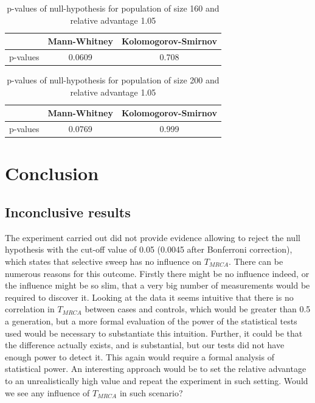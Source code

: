 \documentclass{l4proj}
\begin{document}
\begin{table}[]
    \centering
    \begin{tabular}{|c|c|c|}
    \hline
    & Mann-Whitney & Kolomogorov-Smirnov \\ \hline
    p-values & 0.0609 & 0.708  \\ \hline
    \end{tabular}
    \caption{p-values of null-hypothesis for population of size 160 and relative advantage 1.05}
\end{table}

\begin{table}[]
    \centering
    \begin{tabular}{|c|c|c|}
    \hline
    & Mann-Whitney & Kolomogorov-Smirnov \\ \hline
    p-values & 0.0769 & 0.999  \\ \hline
    \end{tabular}
    \caption{p-values of null-hypothesis for population of size 200 and relative advantage 1.05}
\end{table}


\chapter{Conclusion}\label{conclusion}

\section{Inconclusive results}

The experiment carried out did not provide evidence allowing to reject the null hypothesis with the cut-off value of 0.05 (0.0045 after Bonferroni correction), which states that selective sweep has no influence on $T_{MRCA}$. There can be numerous reasons for this outcome. Firstly there might be no influence indeed, or the influence might be so slim, that a very big number of measurements would be required to discover it. Looking at the data it seems intuitive that there is no correlation in $T_{MRCA}$ between cases and controls, which would be greater than 0.5 a generation, but a more formal evaluation of the power of the statistical tests used would be necessary to substantiate this intuition. Further, it could be that the difference actually exists, and is substantial, but our tests did not have enough power to detect it. This again would require a formal analysis of statistical power. An interesting approach would be to set the relative advantage to an unrealistically high value and repeat the experiment in such setting. Would we see any influence of $T_{MRCA}$ in such scenario?
\end{document}
